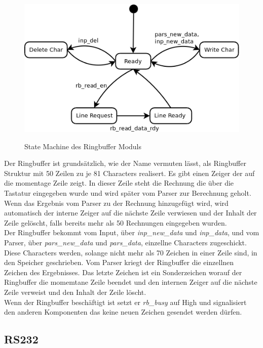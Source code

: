 \begin{figure}[!ht]
 \caption{State Machine des Ringbuffer Moduls}
 \centering
 \includegraphics[scale=0.55]{pics/Ringbuffer.png}
 \label{fig:Modules}
\end{figure}

Der Ringbuffer ist grundsätzlich, wie der Name vermuten lässt, als Ringbuffer Struktur mit 50 Zeilen
zu je 81 Characters realisert. Es gibt einen Zeiger der auf die momentage Zeile zeigt. In dieser Zeile
steht die Rechnung die über die Tastatur eingegeben wurde und wird später vom Parser zur Berechnung
geholt. Wenn das Ergebnis vom Parser zu der Rechnung hinzugefügt wird, wird automatisch der interne Zeiger
auf die nächste Zeile verwiesen und der Inhalt der Zeile gelöscht, falls bereits mehr als 50 Rechnungen
eingegeben wurden.\\
Der Ringbuffer bekommt vom Input, über \textit{inp\_new\_data} und \textit{inp\_data}, und vom Parser, 
über \textit{pars\_new\_data} und \textit{pars\_data}, einzellne Characters zugeschickt.\\
Diese Characters werden, solange nicht mehr als 70 Zeichen in einer Zeile sind, in den Speicher geschrieben.
Vom Parser kriegt der Ringbuffer die einzellnen Zeichen des Ergebnisses. Das letzte Zeichen ist ein
Sonderzeichen worauf der Ringbuffer die momemtane Zeile beendet und den internen Zeiger auf die nächste
Zeile verweist und den Inhalt der Zeile löscht.\\
Wenn der Ringbuffer beschäftigt ist setzt er \textit{rb\_busy} auf High und signalisiert den anderen
Komponenten das keine neuen Zeichen gesendet werden dürfen.


\subsection{RS232}

